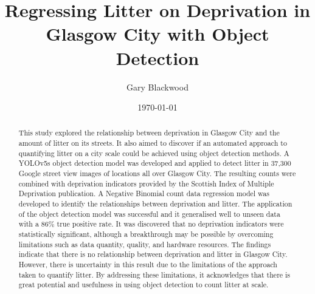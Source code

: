 \documentclass{thesis}
\begin{document}

\title{Regressing Litter on Deprivation in Glasgow City with Object Detection}
\author{Gary Blackwood}
\date{\today}
\maketitle


\begin{abstract}

This study explored the relationship between deprivation in Glasgow City and the amount of litter on its streets. It also aimed to discover if an automated approach to quantifying litter on a city scale could be achieved using object detection methods. A YOLOv5s object detection model was developed and applied to detect litter in 37,300 Google street view images of locations all over Glasgow City. The resulting counts were combined with deprivation indicators provided by the Scottish Index of Multiple Deprivation publication. A Negative Binomial count data regression model was developed to identify the relationships between deprivation and litter. The application of the object detection model was successful and it generalised well to unseen data with a 86\% true positive rate. It was discovered that no deprivation indicators were statistically significant, although a breakthrough may be possible by overcoming limitations such as data quantity, quality, and hardware resources. The findings indicate that there is no relationship between deprivation and litter in Glasgow City. However, there is uncertainty in this result due to the limitations of the approach taken to quantify litter. By addressing these limitations, it acknowledges that there is great potential and usefulness in using object detection to count litter at scale.

\end{abstract}

\end{document}
